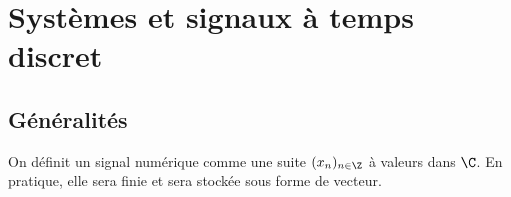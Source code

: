 \minitoc 




\section{Systèmes et signaux à temps discret}

\subsection{Généralités}

\begin{definition}[Signal]
    On définit un signal numérique comme une suite $(x_n)_{n \in \Z} $ 
    à valeurs dans $ \C$. 
    En pratique, elle sera finie et sera stockée sous forme de vecteur. 
\end{definition}

